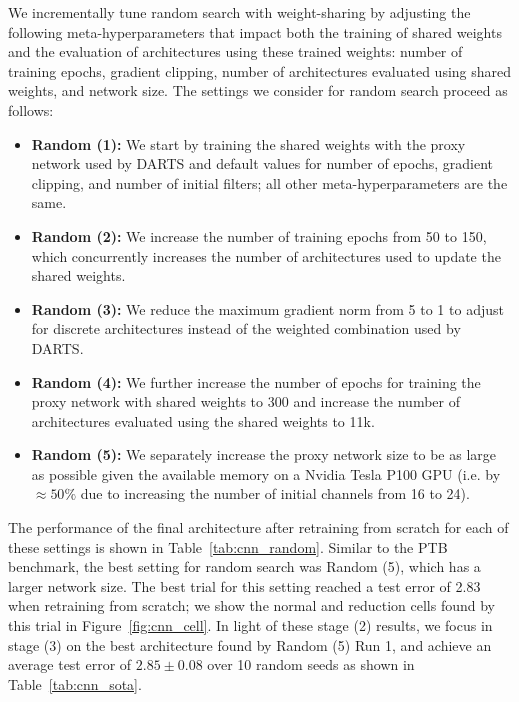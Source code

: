 \documentclass[acmlarge, nonacm]{acmart}
\begin{document}
We incrementally tune random search with weight-sharing by adjusting the following meta-hyperparameters that impact both the training of shared weights and the evaluation of architectures using these trained weights: number of training epochs, gradient clipping, number of architectures evaluated using shared weights, and network size. The settings we consider for random search proceed as follows:
\begin{itemize}
    \item \textbf{Random (1):} We start by training the shared weights with the proxy network used by DARTS and default values for number of epochs, gradient clipping, and number of initial filters; all other meta-hyperparameters are the same.
    \item \textbf{Random (2):} We increase the number of training epochs from 50 to 150, which concurrently increases the number of architectures used to update the shared weights.
    \item \textbf{Random (3):} We reduce the maximum gradient norm from 5 to 1 to adjust for discrete architectures instead of the weighted combination used by DARTS.
    \item \textbf{Random (4):} We further increase the number of epochs for training the proxy network with shared weights to 300 and increase the number of architectures evaluated using the shared weights to 11k. 
    \item \textbf{Random (5):} We separately increase the proxy network size to be as large as possible given the available memory on a Nvidia Tesla P100 GPU (i.e. by $\approx 50\%$ due to increasing the number of initial channels from 16 to 24).
\end{itemize} 
The performance of the final architecture after retraining from scratch for each of these settings is shown in Table~\ref{tab:cnn_random}. 
Similar to the PTB benchmark, the best setting for random search was Random (5), which has a larger network size.  The best trial for this setting reached a test error of 2.83 when retraining from scratch; we show the normal and reduction cells found by this trial in Figure~\ref{fig:cnn_cell}.
In light of these stage (2) results, we focus in stage (3) on the best architecture found by Random (5) Run 1, and achieve an average test error of $2.85\pm 0.08$ over 10 random seeds as shown in Table~\ref{tab:cnn_sota}.
\end{document}
